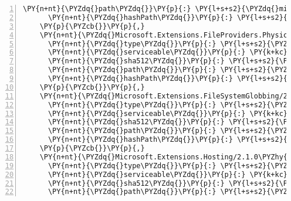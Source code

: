 \begin{Verbatim}[commandchars=\\\{\},numbers=left,firstnumber=1,stepnumber=1,numberblanklines=0]
      \PY{n+nt}{\PYZdq{}path\PYZdq{}}\PY{p}{:} \PY{l+s+s2}{\PYZdq{}microsoft.extensions.fileproviders.embedded/2.1.0\PYZhy{}rc1\PYZhy{}final\PYZdq{}}\PY{p}{,}
      \PY{n+nt}{\PYZdq{}hashPath\PYZdq{}}\PY{p}{:} \PY{l+s+s2}{\PYZdq{}microsoft.extensions.fileproviders.embedded.2.1.0\PYZhy{}rc1\PYZhy{}final.nupkg.sha512\PYZdq{}}
    \PY{p}{\PYZcb{}}\PY{p}{,}
    \PY{n+nt}{\PYZdq{}Microsoft.Extensions.FileProviders.Physical/2.1.0\PYZhy{}rc1\PYZhy{}final\PYZdq{}}\PY{p}{:} \PY{p}{\PYZob{}}
      \PY{n+nt}{\PYZdq{}type\PYZdq{}}\PY{p}{:} \PY{l+s+s2}{\PYZdq{}package\PYZdq{}}\PY{p}{,}
      \PY{n+nt}{\PYZdq{}serviceable\PYZdq{}}\PY{p}{:} \PY{k+kc}{true}\PY{p}{,}
      \PY{n+nt}{\PYZdq{}sha512\PYZdq{}}\PY{p}{:} \PY{l+s+s2}{\PYZdq{}sha512\PYZhy{}At7A67N/xTjYr/SKGYOAQPEAyjKuuXEIPHVKeWZPM0bZHo2PjU6+1QduKOrPM8CXXCkutma6Ht5IVEZ/7TZAWQ==\PYZdq{}}\PY{p}{,}
      \PY{n+nt}{\PYZdq{}path\PYZdq{}}\PY{p}{:} \PY{l+s+s2}{\PYZdq{}microsoft.extensions.fileproviders.physical/2.1.0\PYZhy{}rc1\PYZhy{}final\PYZdq{}}\PY{p}{,}
      \PY{n+nt}{\PYZdq{}hashPath\PYZdq{}}\PY{p}{:} \PY{l+s+s2}{\PYZdq{}microsoft.extensions.fileproviders.physical.2.1.0\PYZhy{}rc1\PYZhy{}final.nupkg.sha512\PYZdq{}}
    \PY{p}{\PYZcb{}}\PY{p}{,}
    \PY{n+nt}{\PYZdq{}Microsoft.Extensions.FileSystemGlobbing/2.1.0\PYZhy{}rc1\PYZhy{}final\PYZdq{}}\PY{p}{:} \PY{p}{\PYZob{}}
      \PY{n+nt}{\PYZdq{}type\PYZdq{}}\PY{p}{:} \PY{l+s+s2}{\PYZdq{}package\PYZdq{}}\PY{p}{,}
      \PY{n+nt}{\PYZdq{}serviceable\PYZdq{}}\PY{p}{:} \PY{k+kc}{true}\PY{p}{,}
      \PY{n+nt}{\PYZdq{}sha512\PYZdq{}}\PY{p}{:} \PY{l+s+s2}{\PYZdq{}sha512\PYZhy{}qZM91WxT87JGOBHeLbYr40/mU3hZa+S02tiiD1Uw6AY9QooULhLkZZU/hLsU6X2gZ0lWDdjR/lm/jI/hUZAK+Q==\PYZdq{}}\PY{p}{,}
      \PY{n+nt}{\PYZdq{}path\PYZdq{}}\PY{p}{:} \PY{l+s+s2}{\PYZdq{}microsoft.extensions.filesystemglobbing/2.1.0\PYZhy{}rc1\PYZhy{}final\PYZdq{}}\PY{p}{,}
      \PY{n+nt}{\PYZdq{}hashPath\PYZdq{}}\PY{p}{:} \PY{l+s+s2}{\PYZdq{}microsoft.extensions.filesystemglobbing.2.1.0\PYZhy{}rc1\PYZhy{}final.nupkg.sha512\PYZdq{}}
    \PY{p}{\PYZcb{}}\PY{p}{,}
    \PY{n+nt}{\PYZdq{}Microsoft.Extensions.Hosting/2.1.0\PYZhy{}rc1\PYZhy{}final\PYZdq{}}\PY{p}{:} \PY{p}{\PYZob{}}
      \PY{n+nt}{\PYZdq{}type\PYZdq{}}\PY{p}{:} \PY{l+s+s2}{\PYZdq{}package\PYZdq{}}\PY{p}{,}
      \PY{n+nt}{\PYZdq{}serviceable\PYZdq{}}\PY{p}{:} \PY{k+kc}{true}\PY{p}{,}
      \PY{n+nt}{\PYZdq{}sha512\PYZdq{}}\PY{p}{:} \PY{l+s+s2}{\PYZdq{}sha512\PYZhy{}P0PvMMSRjdJ5voqQB5O1zkQ5EVuhooUoSpvHVtSFMpbE9SsF1UqcmdGSi2+l/FMTlamYtviIEag3mKkv+pdsnA==\PYZdq{}}\PY{p}{,}
      \PY{n+nt}{\PYZdq{}path\PYZdq{}}\PY{p}{:} \PY{l+s+s2}{\PYZdq{}microsoft.extensions.hosting/2.1.0\PYZhy{}rc1\PYZhy{}final\PYZdq{}}\PY{p}{,}

\end{Verbatim}
